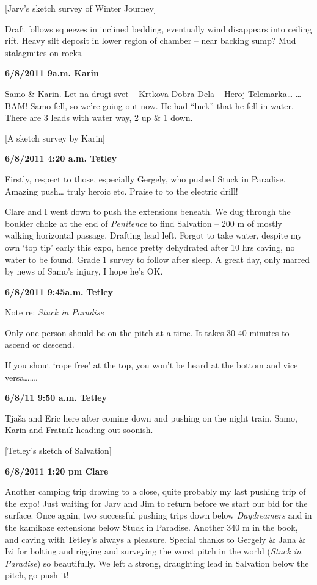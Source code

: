 {[}Jarv's sketch survey of Winter Journey{]}

Draft follows squeezes in inclined bedding, eventually wind disappears
into ceiling rift. Heavy silt deposit in lower region of chamber -- near
backing sump? Mud stalagmites on rocks.

\textbf{6/8/2011 9a.m. Karin}

Samo \& Karin. Let na drugi svet -- Krtkova Dobra Dela -- Heroj
Telemarka\ldots{} \ldots{}BAM! Samo fell, so we're going out now. He had
``luck'' that he fell in water. There are 3 leads with water way, 2 up
\& 1 down.

{[}A sketch survey by Karin{]}

\textbf{6/8/2011 4:20 a.m. Tetley}

Firstly, respect to those, especially Gergely, who pushed Stuck in
Paradise. Amazing push\ldots{} truly heroic etc. Praise to to the
electric drill!

Clare and I went down to push the extensions beneath. We dug through the
boulder choke at the end of \emph{Penitence} to find Salvation -- 200 m
of mostly walking horizontal passage. Drafting lead left. Forgot to take
water, despite my own `top tip' early this expo, hence pretty dehydrated
after 10 hrs caving, no water to be found. Grade 1 survey to follow
after sleep. A great day, only marred by news of Samo's injury, I hope
he's OK.

\textbf{6/8/2011 9:45a.m.} \textbf{Tetley}

Note re: \emph{Stuck in Paradise}

Only one person should be on the pitch at a time. It takes 30-40 minutes
to ascend or descend.

If you shout `rope free' at the top, you won't be heard at the bottom
and vice versa\ldots{}\ldots{}.

\textbf{6/8/11 9:50 a.m. Tetley}

Tjaša and Eric here after coming down and pushing on the night train.
Samo, Karin and Fratnik heading out soonish.

{[}Tetley's sketch of Salvation{]}

\textbf{6/8/2011 1:20 pm Clare}

Another camping trip drawing to a close, quite probably my last pushing
trip of the expo! Just waiting for Jarv and Jim to return before we
start our bid for the surface. Once again, two successful pushing trips
down below \emph{Daydreamers} and in the kamikaze extensions below Stuck
in Paradise. Another 340 m in the book, and caving with Tetley's always
a pleasure. Special thanks to Gergely \& Jana \& Izi for bolting and
rigging and surveying the worst pitch in the world (\emph{Stuck in
Paradise}) so beautifully. We left a strong, draughting lead in
Salvation below the pitch, go push it!

